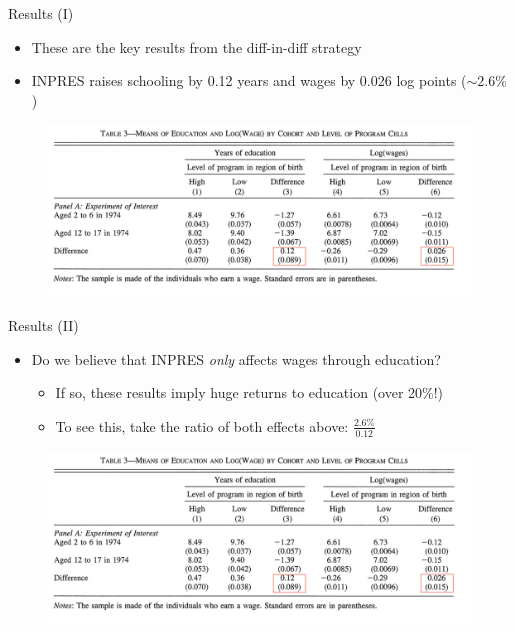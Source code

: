 \documentclass[11pt,notes=hide,aspectratio=169,mathserif]{beamer}
\begin{document}
\begin{frame}{Results (I)}
\begin{itemize}
    \item These are the key results from the diff-in-diff strategy
     \item  INPRES raises schooling by 0.12 years and wages by 0.026 log points ($\sim 2.6\%$)
\end{itemize}
\begin{figure}
    \centering
    \includegraphics[width=\textwidth]{inputs/Table3a.png}
\end{figure}
\end{frame}

\begin{frame}{Results (II)}
\begin{itemize}
    \item Do we believe that INPRES \textit{only} affects wages through education?
    \begin{itemize}
         \item  If so, these results imply huge returns to education (over 20\%!)
         \item  To see this, take the ratio of both effects above: $\frac{2.6\%}{0.12}$
    \end{itemize}
\end{itemize}
\begin{figure}
    \centering
    \includegraphics[width=\textwidth]{inputs/Table3a.png}
\end{figure}
\end{frame}
\end{document}
